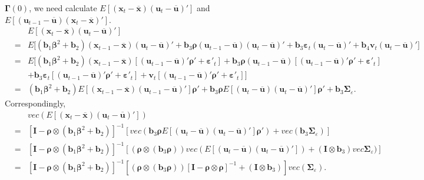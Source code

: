 \begin{appendix}
${\pmb \Gamma}(0)$, we need calculate $E[({\pmb x}_{t}-{\pmb{\overline
x}})({\pmb u}_{t}-{\pmb{\overline u}})']$ and $E[({\pmb u}_{t-1}-{\pmb{\overline
u}})({\pmb x}_{t}-{\pmb{\overline x}})']$.
\begin{eqnarray*}
&&E[({\pmb x}_{t}-{\pmb{\overline
x}})({\pmb u}_{t}-{\pmb{\overline u}})']\nonumber\\
&=&E\Big[({\pmb b}_1 {\pmb\beta}^2+{\pmb b}_2)({\pmb x}_{t-1}-{\pmb{\overline
x}})({\pmb u}_{t}-{\pmb{\overline u}})'+{\pmb b}_3{\pmb\rho}({\pmb u}_{t-1}-{\pmb{\overline
u}})({\pmb u}_{t}-{\pmb{\overline u}})'+{\pmb b}_3{\pmb\varepsilon}_t({\pmb u}_{t}-{\pmb{\overline u}})'+{\pmb b}_4{\pmb v}_t({\pmb u}_{t}-{\pmb{\overline u}})'\Big]\nonumber\\
&=&E\Big[({\pmb b}_1 {\pmb\beta}^2+{\pmb b}_2)({\pmb x}_{t-1}-{\pmb{\overline
x}})[({\pmb u}_{t-1}-{\pmb{\overline u}})'{\pmb\rho}'+{\pmb\varepsilon}'_t]+{\pmb b}_3{\pmb\rho}({\pmb u}_{t-1}-{\pmb{\overline
u}})[({\pmb u}_{t-1}-{\pmb{\overline u}})'{\pmb\rho}'+{\pmb\varepsilon}'_t]\nonumber\\
&&+{\pmb b}_3{\pmb\varepsilon}_t[({\pmb u}_{t-1}-{\pmb{\overline u}})'{\pmb\rho}'+{\pmb\varepsilon}'_t]+{\pmb v}_t[({\pmb u}_{t-1}-{\pmb{\overline u}})'{\pmb\rho}'+{\pmb\varepsilon}'_t]\Big]\nonumber\\
&=&({\pmb b}_1 {\pmb\beta}^2+{\pmb b}_2)E[({\pmb x}_{t-1}-{\pmb{\overline
x}})({\pmb u}_{t-1}-{\pmb{\overline u}})']{\pmb\rho}'+{\pmb b}_3{\pmb\rho}E[({\pmb u}_{t}-{\pmb{\overline
u}})({\pmb u}_{t}-{\pmb{\overline u}})']{\pmb\rho}'+{\pmb b}_3{\pmb\Sigma_{\varepsilon}}.
\end{eqnarray*}
Correspondingly,
\begin{eqnarray}\label{corpymp}
&&vec(E[({\pmb x}_{t}-{\pmb{\overline
x}})({\pmb u}_{t}-{\pmb{\overline u}})'])\nonumber\\
&=&[{\pmb I}-{\pmb \rho}\otimes({\pmb b}_1 {\pmb\beta}^2+{\pmb b}_2)]^{-1}[vec({\pmb b}_3{\pmb\rho}E[({\pmb u}_{t}-{\pmb{\overline
u}})({\pmb u}_{t}-{\pmb{\overline u}})']{\pmb\rho}')+vec({\pmb b}_3{\pmb\Sigma_{\varepsilon}})]\nonumber\\
&=&[{\pmb I}-{\pmb \rho}\otimes({\pmb b}_1 {\pmb\beta}^2+{\pmb b}_2)]^{-1}[({\pmb\rho}\otimes({\pmb b}_3{\pmb\rho}))vec(E[({\pmb u}_{t}-{\pmb{\overline
u}})({\pmb u}_{t}-{\pmb{\overline u}})'])+({\pmb I}\otimes{\pmb b}_3)vec{\pmb\Sigma_{\varepsilon}})]\nonumber\\
&=&[{\pmb I}-{\pmb \rho}\otimes({\pmb b}_1 {\pmb\beta}^2+{\pmb b}_2)]^{-1}[({\pmb\rho}\otimes({\pmb b}_3{\pmb\rho}))[{\pmb I}-{\pmb \rho}\otimes{\pmb \rho}]^{-1}+({\pmb I}\otimes{\pmb b}_3)]vec({\pmb \Sigma_{\varepsilon}}).

\end{eqnarray}
\end{appendix}
